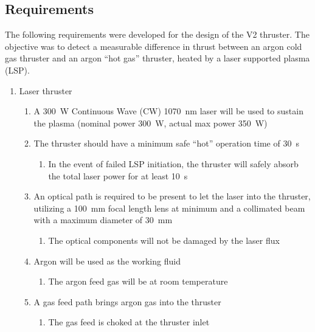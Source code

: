         \subsection{Requirements}

            The following requirements were developed for the design of the V2 thruster. The objective was to detect a measurable difference in thrust between an argon cold gas thruster and an argon “hot gas” thruster, heated by a laser supported plasma (LSP).

            \begin{enumerate}
                \item Laser thruster
                \begin{enumerate}
                    \item A \qty{300}{W} Continuous Wave (CW) \qty{1070}{nm} laser will be used to sustain the plasma (nominal power \qty{300}{W}, actual max power \qty{350}{W})
                    \item The thruster should have a minimum safe “hot” operation time of \qty{30}{s}
                    \begin{enumerate}
                        \item In the event of failed LSP initiation, the thruster will safely absorb the total laser power for at least \qty{10}{s}
                    \end{enumerate}
                    \item An optical path is required to be present to let the laser into the thruster, utilizing a \qty{100}{mm} focal length lens at minimum and a collimated beam with a maximum diameter of \qty{30}{mm}
                    \begin{enumerate}
                        \item The optical components will not be damaged by the laser flux
                    \end{enumerate}
                    \item Argon will be used as the working fluid
                    \begin{enumerate}
                        \item The argon feed gas will be at room temperature
                    \end{enumerate}
                    \item A gas feed path brings argon gas into the thruster
                    \begin{enumerate}
                        \item The gas feed is choked at the thruster inlet

\end{enumerate}
\end{enumerate}
\end{enumerate}
